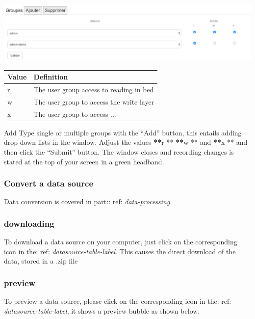 \documentclass[letterpaper,10pt,english]{sphinxmanual}
\begin{document}
\includegraphics[width=1.000\linewidth]{data-privileges.png}

\begin{tabulary}{\linewidth}{|L|L|}
\hline

\textbf{Value}
 & 
\textbf{Definition}
\\
\hline
r
 & 
The user group access to reading in bed
\\
\hline
w
 & 
The user group to access the write layer
\\
\hline
x
 & 
The user group to access ...
\\
\hline\end{tabulary}


Add Type single or multiple groups with the ``Add'' button, this entails adding drop-down lists in the window. Adjust the values  {\color{red}\bfseries{}**}r ** {\color{red}\bfseries{}**}w **  and  {\color{red}\bfseries{}**}x ** and then click the ``Submit'' button. The window closes and recording changes is stated at the top of your screen in a green headband.


\subsubsection{Convert a data source}
\label{data/datasources:convertir-une-source-de-donnees}
Data conversion is covered in part:: ref: \emph{data-processing}.


\subsubsection{downloading}
\label{data/datasources:telechargement}
To download a data source on your computer, just click on the corresponding icon in the: ref: \emph{datasource-table-label}. This causes the direct download of the data, stored in a .zip file


\subsubsection{preview}
\label{data/datasources:previsualisation}
To preview a data source, please click on the corresponding icon in the: ref: \emph{datasource-table-label}, it shows a preview bubble as shown below.
\end{document}
